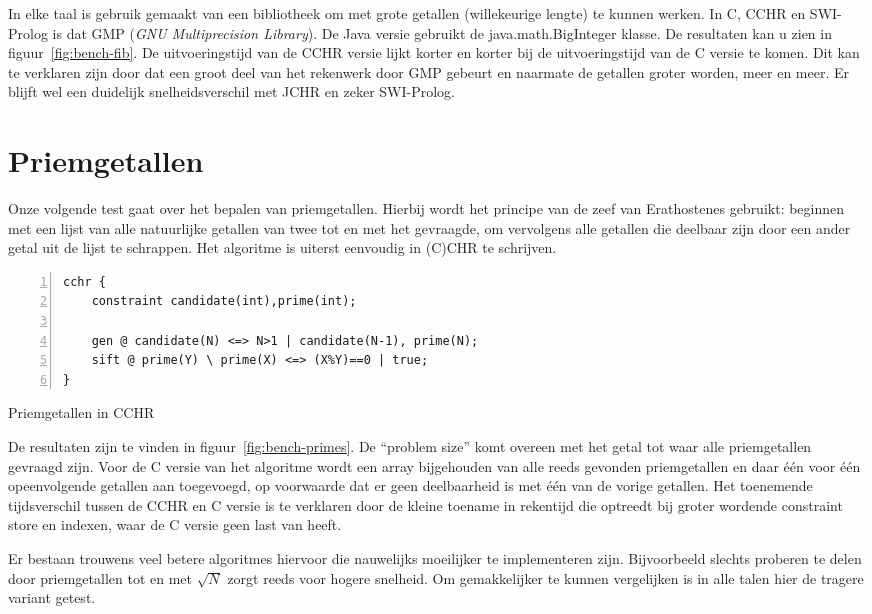 In elke taal is gebruik gemaakt van een bibliotheek om met grote getallen (willekeurige lengte) te kunnen werken. In C, CCHR en SWI-Prolog is dat GMP ({\em GNU Multiprecision Library}). De Java versie gebruikt de java.math.BigInteger klasse. De resultaten kan u zien in figuur~\ref{fig:bench-fib}. De uitvoeringstijd van de CCHR versie lijkt korter en korter bij de uitvoeringstijd van de C versie te komen. Dit kan te verklaren zijn door dat een groot deel van het rekenwerk door GMP gebeurt en naarmate de getallen groter worden, meer en meer. Er blijft wel een duidelijk snelheidsverschil met JCHR en zeker SWI-Prolog.

\section{Priemgetallen} \label{sec:bench-primes}

Onze volgende test gaat over het bepalen van priemgetallen. Hierbij wordt het principe van de zeef van Erathostenes gebruikt: beginnen met een lijst van alle natuurlijke getallen van twee tot en met het gevraagde, om vervolgens alle getallen die deelbaar zijn door een ander getal uit de lijst te schrappen. Het algoritme is uiterst eenvoudig in (C)CHR te schrijven.
\begin{exCode}
\begin{Verbatim}[frame=single,numbers=left]
cchr {
    constraint candidate(int),prime(int);

    gen @ candidate(N) <=> N>1 | candidate(N-1), prime(N);
    sift @ prime(Y) \ prime(X) <=> (X%Y)==0 | true;
}
\end{Verbatim}
\caption{\label{code:primes} Priemgetallen in CCHR}
\end{exCode}

De resultaten zijn te vinden in figuur~\ref{fig:bench-primes}. De ``problem size'' komt overeen met het getal tot waar alle priemgetallen gevraagd zijn. Voor de C versie van het algoritme wordt een array bijgehouden van alle reeds gevonden priemgetallen en daar \'e\'en voor \'e\'en opeenvolgende getallen aan toegevoegd, op voorwaarde dat er geen deelbaarheid is met \'e\'en van de vorige getallen. Het toenemende tijdsverschil tussen de CCHR en C versie is te verklaren door de kleine toename in rekentijd die optreedt bij groter wordende constraint store en indexen, waar de C versie geen last van heeft.

Er bestaan trouwens veel betere algoritmes hiervoor die nauwelijks moeilijker te implementeren zijn. Bijvoorbeeld slechts proberen te delen door priemgetallen tot en met $\sqrt{N}$ zorgt reeds voor hogere snelheid. Om gemakkelijker te kunnen vergelijken is in alle talen hier de tragere variant getest.

